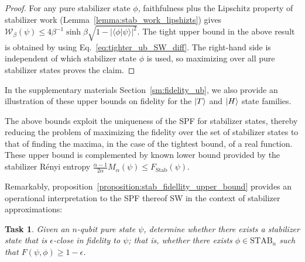 \documentclass[aps,pra,superscriptaddress,twocolumn,longbibliography]{revtex4-2}
\newtheorem{task}{Task}
\begin{document}
\begin{proof}
For any pure stabilizer state $\phi$, faithfulness plus the Lipschitz property of stabilizer work (Lemma~\ref{lemma:stab_work_lipshizts}) gives $\mathcal{W}_\beta(\psi) \leq 4\beta^{-1}\sinh\beta \sqrt{1-|\langle\phi|\psi\rangle|^2}$. 
The tight upper bound in the above result is obtained by using Eq.~\eqref{eq:tighter_ub_SW_diff}.
The right-hand side is independent of which stabilizer state \(\phi\) is used, so maximizing over all pure stabilizer states proves the claim. 
\end{proof}


In the supplementary materials Section~\ref{sm:fidelity_ub}, we also provide an illustration of these upper bounds on fidelity for the $\ket{T}$ and $\ket{H}$ state families.

The above bounds exploit the uniqueness of the SPF for stabilizer states, thereby reducing the problem of maximizing the fidelity over the set of stabilizer states to that of finding the maxima, in the case of the tightest bound, of a real function. These upper bound is complemented by known \cite{Tobi/Stab_Fidelity/2023,Gu/pseudomagic/2024} lower bound provided by the stabilizer R\'enyi entropy $\frac{\alpha-1}{2\alpha} M_{\alpha}(\psi) \leq F_{\text{Stab}}(\psi)$.

Remarkably, proposition~\ref{proposition:stab_fidellity_upper_bound} provides an operational interpretation to the SPF thereof SW in the context of stabilizer approximations:

\begin{task}
Given an $n$-qubit pure state $\psi$, determine whether there exists a stabilizer state that is $\epsilon$-close in fidelity to $\psi$; that is, whether there exists $\phi\in\mathrm{STAB}_{n}$ such that $F(\psi,\phi)\ge 1-\epsilon$. 
\end{task}
\end{document}
